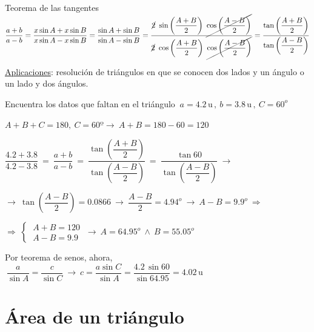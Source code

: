 \begin{myexampleblock}{Teorema de las tangentes}
\vspace{2mm} $\dfrac{a+b}{a-b}=\dfrac{x\sin A+ x\sin B}{x\sin A-x\sin B}=\dfrac{\sin A+ \sin B}{\sin A-\sin B}=\dfrac{\cancel{2}\ \sin \left( \dfrac{A+B}{2} \right) \ \cancel{ \cos \left( \dfrac{A-B}{2} \right)  } } 
{\cancel{2}\ \cos \left( \dfrac{A+B}{2} \right) \ \cancel{ \cos \left( \dfrac{A-B}{2} \right)  } } = 
\dfrac{ \tan \left( \dfrac{A+B}{2} \right) }{  \tan \left( \dfrac{A-B}{2} \right) }$ \QED


\vspace{2mm} \underline{Aplicaciones}: resolución de triángulos en que se conocen dos lados y un ángulo o un lado y dos ángulos.

\vspace{2mm}
\begin{footnotesize}
\begin{miejemplo}

Encuentra los datos que faltan en el triángulo $\ a=4.2\, \mathrm{u}\, , \ b=3.8\, \mathrm{u} \, , \ C=60^o$

\vspace{4mm} $A+B+C=180 ,\ C=60 º \to \ A+B=180-60=120$

\vspace{2mm} $\dfrac{4.2+3.8}{4.2-3.8} \ = \ \dfrac{a+b}{a-b} \ = \ \dfrac{ \tan \left( \dfrac{A+B}{2} \right) }{  \tan \left( \dfrac{A-B}{2} \right) }\ = \ \dfrac{\tan 60 }{ \tan \left( \dfrac{A-B}{2} \right) } \ \to \ $

\vspace{2mm} $\to \ \tan \left( \dfrac{A-B}{2} \right)=0.0866 \ \to \ \dfrac{A-B}{2}=4.94^o \ \to \ A-B=9.9^o \ \Rightarrow$

\vspace{2mm}$\Rightarrow \ \begin{cases}
 	\ A+B=120 \\ \ A-B=9.9 
 \end{cases} \ \to \ A=64.95^o \ \wedge \ B=55.05^o$

\vspace{2mm}  Por teorema de senos, ahora, $\ \dfrac{a}{\sin A}=\dfrac{c}{\sin C} \ \to \ c=\dfrac{a\sin C}{\sin A}=\dfrac{4.2\, \sin 60}{\sin 64.95}= 4.02\, \mathrm{u}$		
\end{miejemplo}
\end{footnotesize}

\end{myexampleblock}

\vspace{5mm}
\section{Área de un triángulo}
\vspace{5mm}


